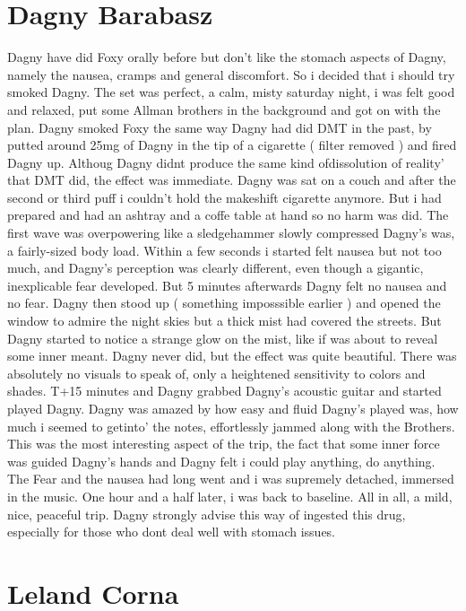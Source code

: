 \documentclass[12pt]{book}
\begin{document}
\chapter{Dagny Barabasz}

Dagny have did Foxy orally before but don't like the stomach aspects of Dagny, namely the nausea, cramps and general discomfort. So i decided that i should try smoked Dagny. The set was perfect, a calm, misty saturday night, i was felt good and relaxed, put some Allman brothers in the background and got on with the plan. Dagny smoked Foxy the same way Dagny had did DMT in the past, by putted around 25mg of Dagny in the tip of a cigarette ( filter removed ) and fired Dagny up. Althoug Dagny didnt produce the same kind ofdissolution of reality' that DMT did, the effect was immediate. Dagny was sat on a couch and after the second or third puff i couldn't hold the makeshift cigarette anymore. But i had prepared and had an ashtray and a coffe table at hand so no harm was did. The first wave was overpowering like a sledgehammer slowly compressed Dagny's was, a fairly-sized body load. Within a few seconds i started felt nausea but not too much, and Dagny's perception was clearly different, even though a gigantic, inexplicable fear developed. But 5 minutes afterwards Dagny felt no nausea and no fear. Dagny then stood up ( something imposssible earlier ) and opened the window to admire the night skies but a thick mist had covered the streets. But Dagny started to notice a strange glow on the mist, like if was about to reveal some inner meant. Dagny never did, but the effect was quite beautiful. There was absolutely no visuals to speak of, only a heightened sensitivity to colors and shades. T+15 minutes and Dagny grabbed Dagny's acoustic guitar and started played Dagny. Dagny was amazed by how easy and fluid Dagny's played was, how much i seemed to getinto' the notes, effortlessly jammed along with the Brothers. This was the most interesting aspect of the trip, the fact that some inner force was guided Dagny's hands and Dagny felt i could play anything, do anything. The Fear and the nausea had long went and i was supremely detached, immersed in the music. One hour and a half later, i was back to baseline. All in all, a mild, nice, peaceful trip. Dagny strongly advise this way of ingested this drug, especially for those who dont deal well with stomach issues.






\chapter{Leland Corna}
\end{document}
